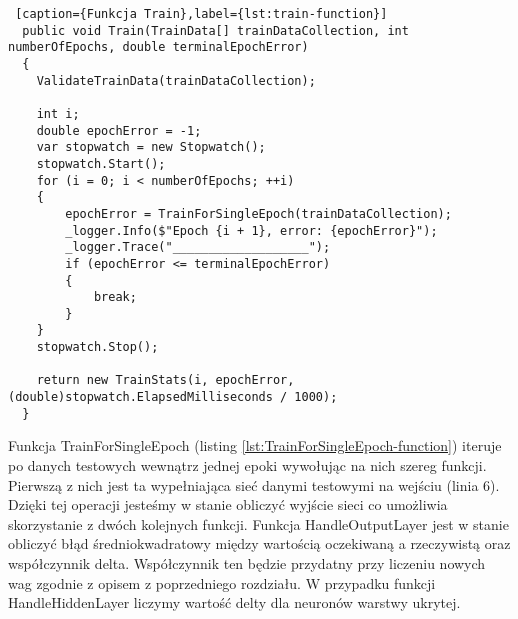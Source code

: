 \begin{lstlisting} [caption={Funkcja Train},label={lst:train-function}]
  public void Train(TrainData[] trainDataCollection, int numberOfEpochs, double terminalEpochError)
  {
    ValidateTrainData(trainDataCollection);

    int i;
    double epochError = -1;
    var stopwatch = new Stopwatch();
    stopwatch.Start();
    for (i = 0; i < numberOfEpochs; ++i)
    {
        epochError = TrainForSingleEpoch(trainDataCollection);
        _logger.Info($"Epoch {i + 1}, error: {epochError}");
        _logger.Trace("___________________");
        if (epochError <= terminalEpochError)
        {
            break;
        }
    }
    stopwatch.Stop();

    return new TrainStats(i, epochError, (double)stopwatch.ElapsedMilliseconds / 1000);
  }
\end{lstlisting}

Funkcja TrainForSingleEpoch (listing \ref{lst:TrainForSingleEpoch-function}) iteruje po danych testowych wewnątrz jednej epoki wywołując na nich szereg funkcji.
Pierwszą z nich jest ta wypełniająca sieć danymi testowymi na wejściu (linia 6). Dzięki tej operacji jesteśmy w stanie obliczyć wyjście sieci co umożliwia skorzystanie z dwóch kolejnych funkcji.
Funkcja HandleOutputLayer jest w stanie obliczyć błąd średniokwadratowy między wartością oczekiwaną a rzeczywistą oraz współczynnik delta.
Współczynnik ten będzie przydatny przy liczeniu nowych wag zgodnie z opisem z poprzedniego rozdziału.
W przypadku funkcji HandleHiddenLayer liczymy wartość delty dla neuronów warstwy ukrytej.


